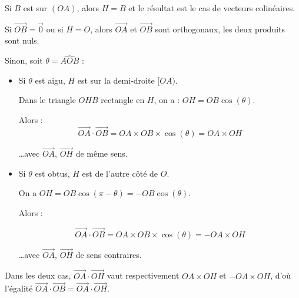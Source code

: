\begin{demonstration}
	Si $B$ est sur $(OA)$, alors $H = B$ et le résultat est le cas de vecteurs colinéaires.

	Si $\vec{OB} = \vec{0}$ ou si $H = O$, alors $\vec{OA}$ et $\vec{OB}$ sont orthogonaux, les deux produits sont nuls.

	Sinon, soit $\theta = \widehat{AOB}$ :
	\begin{itemize}
		\item Si $\theta$ est aigu, $H$ est sur la demi-droite $[OA)$.

		      Dans le triangle $OHB$ rectangle en $H$, on a : $OH = OB\cos(\theta)$.

		      Alors :
		      \[
			      \vec{OA} \cdot \vec{OB} = OA \times OB \times \cos(\theta) = OA \times OH
		      \]

		      \ldots avec $\vec{OA}$, $\vec{OH}$ de même sens.
		\item Si $\theta$ est obtus, $H$ est de l'autre côté de $O$.

		      On a $OH = OB\cos(\pi - \theta) = -OB\cos(\theta)$.

		      Alors :

		      \[
			      \vec{OA} \cdot \vec{OB} = OA \times OB \times \cos(\theta) = -OA \times OH
		      \]

		      \ldots avec $\vec{OA}$, $\vec{OH}$ de sens contraires.
	\end{itemize}

	Dans les deux cas, $\vec{OA} \cdot \vec{OH}$ vaut respectivement $OA \times OH$ et $-OA \times OH$, d'où l'égalité $\vec{OA} \cdot \vec{OB} = \vec{OA} \cdot \vec{OH}$.


\end{demonstration}
